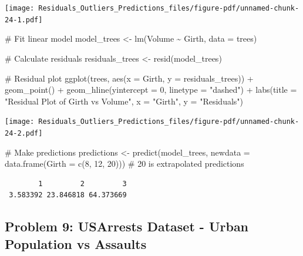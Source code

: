 \documentclass[
  letterpaper,
  DIV=11,
  numbers=noendperiod]{scrreprt}
\newenvironment{Shaded}{\begin{snugshade}}{\end{snugshade}}
\newcommand{\AttributeTok}[1]{\textcolor[rgb]{0.40,0.45,0.13}{#1}}
\newcommand{\CommentTok}[1]{\textcolor[rgb]{0.37,0.37,0.37}{#1}}
\newcommand{\DecValTok}[1]{\textcolor[rgb]{0.68,0.00,0.00}{#1}}
\newcommand{\FunctionTok}[1]{\textcolor[rgb]{0.28,0.35,0.67}{#1}}
\newcommand{\NormalTok}[1]{\textcolor[rgb]{0.00,0.23,0.31}{#1}}
\newcommand{\OtherTok}[1]{\textcolor[rgb]{0.00,0.23,0.31}{#1}}
\newcommand{\SpecialCharTok}[1]{\textcolor[rgb]{0.37,0.37,0.37}{#1}}
\newcommand{\StringTok}[1]{\textcolor[rgb]{0.13,0.47,0.30}{#1}}
\begin{document}
\texttt{[image: Residuals\_Outliers\_Predictions\_files/figure-pdf/unnamed-chunk-24-1.pdf]}

\begin{Shaded}
\begin{Highlighting}[]
\CommentTok{\# Fit linear model}
\NormalTok{model\_trees }\OtherTok{\textless{}{-}} \FunctionTok{lm}\NormalTok{(Volume }\SpecialCharTok{\textasciitilde{}}\NormalTok{ Girth, }\AttributeTok{data =}\NormalTok{ trees)}

\CommentTok{\# Calculate residuals}
\NormalTok{residuals\_trees }\OtherTok{\textless{}{-}} \FunctionTok{resid}\NormalTok{(model\_trees)}

\CommentTok{\# Residual plot}
\FunctionTok{ggplot}\NormalTok{(trees, }\FunctionTok{aes}\NormalTok{(}\AttributeTok{x =}\NormalTok{ Girth, }\AttributeTok{y =}\NormalTok{ residuals\_trees)) }\SpecialCharTok{+}
  \FunctionTok{geom\_point}\NormalTok{() }\SpecialCharTok{+}
  \FunctionTok{geom\_hline}\NormalTok{(}\AttributeTok{yintercept =} \DecValTok{0}\NormalTok{, }\AttributeTok{linetype =} \StringTok{"dashed"}\NormalTok{) }\SpecialCharTok{+}
  \FunctionTok{labs}\NormalTok{(}\AttributeTok{title =} \StringTok{"Residual Plot of Girth vs Volume"}\NormalTok{, }\AttributeTok{x =} \StringTok{"Girth"}\NormalTok{, }\AttributeTok{y =} \StringTok{"Residuals"}\NormalTok{)}
\end{Highlighting}
\end{Shaded}

\texttt{[image: Residuals\_Outliers\_Predictions\_files/figure-pdf/unnamed-chunk-24-2.pdf]}

\begin{Shaded}
\begin{Highlighting}[]
\CommentTok{\# Make predictions}
\NormalTok{predictions }\OtherTok{\textless{}{-}} \FunctionTok{predict}\NormalTok{(model\_trees, }\AttributeTok{newdata =} \FunctionTok{data.frame}\NormalTok{(}\AttributeTok{Girth =} \FunctionTok{c}\NormalTok{(}\DecValTok{8}\NormalTok{, }\DecValTok{12}\NormalTok{, }\DecValTok{20}\NormalTok{))) }\CommentTok{\# 20 is extrapolated}
\NormalTok{predictions}
\end{Highlighting}
\end{Shaded}

\begin{verbatim}
        1         2         3 
 3.583392 23.846818 64.373669 
\end{verbatim}

\subsection*{Problem 9: USArrests Dataset - Urban Population vs
Assaults}\label{problem-9-usarrests-dataset---urban-population-vs-assaults-2}
\end{document}
